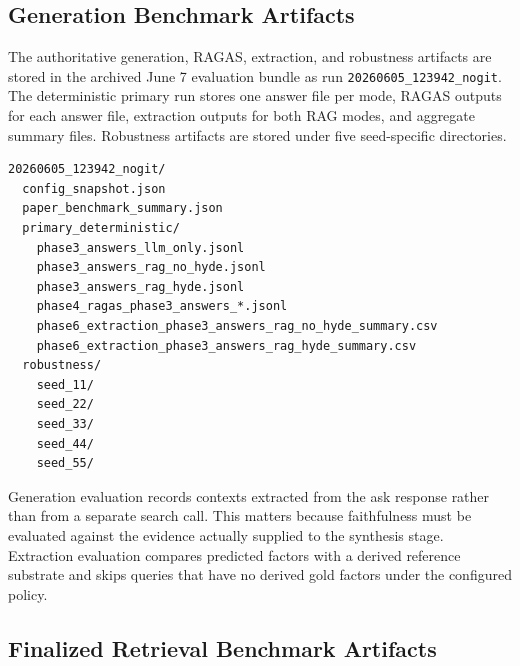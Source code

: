 \subsection{Generation Benchmark Artifacts}

The authoritative generation, RAGAS, extraction, and robustness artifacts are stored in the archived June 7 evaluation bundle as run \texttt{20260605\_123942\_nogit}. The deterministic primary run stores one answer file per mode, RAGAS outputs for each answer file, extraction outputs for both RAG modes, and aggregate summary files. Robustness artifacts are stored under five seed-specific directories.

\begin{lstlisting}[language={},caption={Latest generation benchmark artifacts.}]
20260605_123942_nogit/
  config_snapshot.json
  paper_benchmark_summary.json
  primary_deterministic/
    phase3_answers_llm_only.jsonl
    phase3_answers_rag_no_hyde.jsonl
    phase3_answers_rag_hyde.jsonl
    phase4_ragas_phase3_answers_*.jsonl
    phase6_extraction_phase3_answers_rag_no_hyde_summary.csv
    phase6_extraction_phase3_answers_rag_hyde_summary.csv
  robustness/
    seed_11/
    seed_22/
    seed_33/
    seed_44/
    seed_55/
\end{lstlisting}

Generation evaluation records contexts extracted from the ask response rather than from a separate search call. This matters because faithfulness must be evaluated against the evidence actually supplied to the synthesis stage. Extraction evaluation compares predicted factors with a derived reference substrate and skips queries that have no derived gold factors under the configured policy.

\subsection{Finalized Retrieval Benchmark Artifacts}

